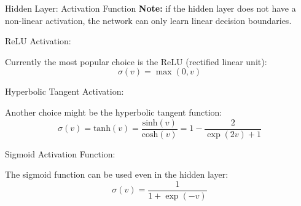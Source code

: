 \begin{vbframe}{Hidden Layer: Activation Function}
\textbf{Note:} if the hidden layer does not have a non-linear activation, the network can only learn linear decision boundaries.
\begin{blocki}{ReLU Activation:}
\item Currently the most popular choice is the ReLU (rectified linear unit):
$$ \sigma (v) = \max(0,v) $$
\end{blocki}
\begin{figure}
\end{figure}
\framebreak

\begin{blocki}{Hyperbolic Tangent Activation:}
\item Another choice might be the hyperbolic tangent function:
$$ \sigma (v) = \text{tanh}(v) = \frac{\text{sinh}(v)}{\text{cosh}(v)} = 1 - \frac{2}{\exp(2v) + 1}$$
\end{blocki}
\begin{figure}
\end{figure}
\framebreak

\begin{blocki}{Sigmoid Activation Function:}
\item The sigmoid function can be used even in the hidden layer:
$$ \sigma(v) = \frac{1}{1+\exp (-v)} $$
\end{blocki}
\begin{figure}
\end{figure}
\end{vbframe}
